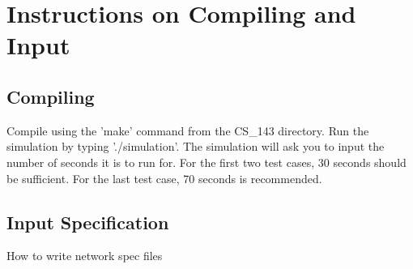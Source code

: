 \documentclass[12pt]{article}
\begin{document}
\appendix
\section{Instructions on Compiling and Input}

\subsection{Compiling}
Compile using the 'make' command from the CS_143 directory. Run the simulation by typing './simulation'. 
The simulation will ask you to input the number of seconds it is to run for. For the first two test cases, 30 seconds should be sufficient. For the last test case, 70 seconds is recommended.


\subsection{Input Specification}
How to write network spec files
\end{document}

